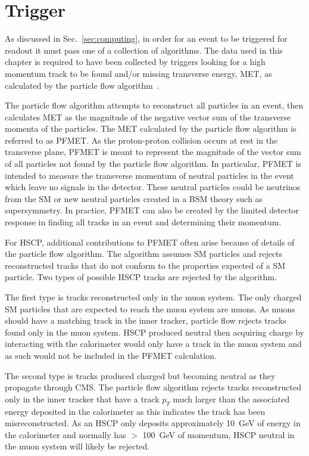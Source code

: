 \section{Trigger \label{sec:trigger}}
As discussed in Sec.~\ref{sec:computing}, in order for an event to be triggered for readout it must pass one of a collection of algorithms.
The data used in this chapter is required to have been collected by triggers looking for a high momentum track to be found
and/or missing transverse energy, MET, as calculated by the particle flow algorithm~\cite{Chatrchyan:2011tn}. 

The particle flow algorithm attempts
to reconstruct all particles in an event, then calculates MET as the magnitude of the negative vector sum of the transverse momenta of the particles. 
The MET calculated by the particle flow algorithm is referred to as PFMET.
As the proton-proton collision occurs
at rest in the transverse plane, PFMET is meant to represent the magnitude of the vector sum of all particles not found by the particle flow algorithm.
In particular, PFMET is intended to measure the transverse momentum of neutral particles in the event which leave no signals in the detector.
These neutral particles could be neutrinos from the SM or new neutral particles created in a BSM theory such as supersymmetry.
In practice, PFMET can also be created by the limited detector response in finding all tracks in an event and determining their momentum.

For HSCP, additional contributions to PFMET often arise because of details of the particle flow algorithm.
The algorithm assumes SM particles and rejects reconstructed tracks that do not conform to the properties expected
of a SM particle. Two types of possible HSCP tracks are rejected by the algorithm. 

The first type is tracks reconstructed only in the muon system. The only charged SM particles that
are expected to reach the muon system are muons. As muons should have a matching track in the inner tracker, particle flow rejects tracks found only in the
muon system. HSCP produced neutral then acquiring charge by interacting with the calorimeter
would only have a track in the muon system and as such would not be included in the PFMET calculation. 

The second type is tracks produced charged but becoming neutral as they propagate through CMS.
The particle flow algorithm rejects tracks reconstructed only in the inner tracker that have a track $p_T$ much larger
than the associated energy deposited in the calorimeter as this indicates the track has been misreconstructed.
As an HSCP only deposits approximately 10~GeV of energy in the calorimeter and normally has $>$ 100~GeV of momentum, HSCP neutral in the muon system will likely be rejected. 

